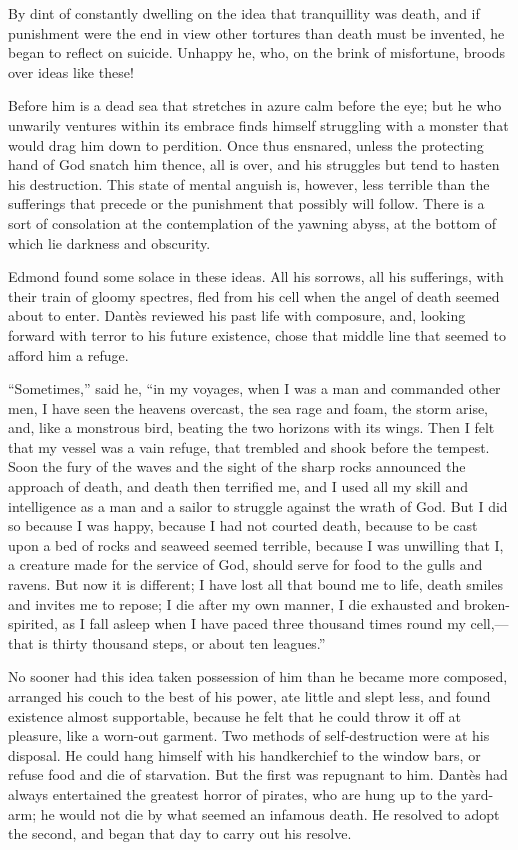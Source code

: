 By dint of constantly dwelling on the idea that tranquillity was death,
and if punishment were the end in view other tortures than death must
be invented, he began to reflect on suicide. Unhappy he, who, on the
brink of misfortune, broods over ideas like these!

Before him is a dead sea that stretches in azure calm before the eye;
but he who unwarily ventures within its embrace finds himself
struggling with a monster that would drag him down to perdition. Once
thus ensnared, unless the protecting hand of God snatch him thence, all
is over, and his struggles but tend to hasten his destruction. This
state of mental anguish is, however, less terrible than the sufferings
that precede or the punishment that possibly will follow. There is a
sort of consolation at the contemplation of the yawning abyss, at the
bottom of which lie darkness and obscurity.

Edmond found some solace in these ideas. All his sorrows, all his
sufferings, with their train of gloomy spectres, fled from his cell
when the angel of death seemed about to enter. Dantès reviewed his past
life with composure, and, looking forward with terror to his future
existence, chose that middle line that seemed to afford him a refuge.

“Sometimes,” said he, “in my voyages, when I was a man and commanded
other men, I have seen the heavens overcast, the sea rage and foam, the
storm arise, and, like a monstrous bird, beating the two horizons with
its wings. Then I felt that my vessel was a vain refuge, that trembled
and shook before the tempest. Soon the fury of the waves and the sight
of the sharp rocks announced the approach of death, and death then
terrified me, and I used all my skill and intelligence as a man and a
sailor to struggle against the wrath of God. But I did so because I was
happy, because I had not courted death, because to be cast upon a bed
of rocks and seaweed seemed terrible, because I was unwilling that I, a
creature made for the service of God, should serve for food to the
gulls and ravens. But now it is different; I have lost all that bound
me to life, death smiles and invites me to repose; I die after my own
manner, I die exhausted and broken-spirited, as I fall asleep when I
have paced three thousand times round my cell,—that is thirty thousand
steps, or about ten leagues.”

No sooner had this idea taken possession of him than he became more
composed, arranged his couch to the best of his power, ate little and
slept less, and found existence almost supportable, because he felt
that he could throw it off at pleasure, like a worn-out garment. Two
methods of self-destruction were at his disposal. He could hang himself
with his handkerchief to the window bars, or refuse food and die of
starvation. But the first was repugnant to him. Dantès had always
entertained the greatest horror of pirates, who are hung up to the
yard-arm; he would not die by what seemed an infamous death. He
resolved to adopt the second, and began that day to carry out his
resolve.

